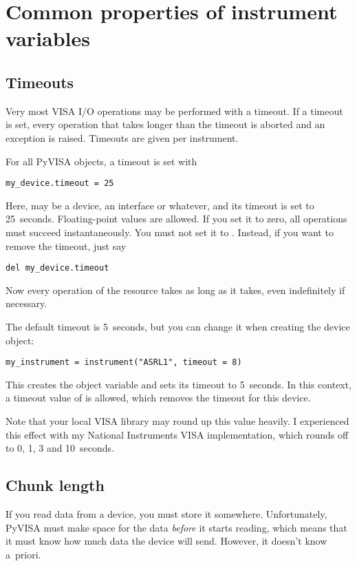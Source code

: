 \documentclass{howto}
\begin{document}
\section{Common properties of instrument variables}


\subsection{Timeouts}
\label{sec:timeouts}

Very most VISA I/O operations may be performed with a timeout.  If a timeout is
set, every operation that takes longer than the timeout is aborted and an
exception is raised.  Timeouts are given per instrument.

For all PyVISA objects, a timeout is set with
\begin{verbatim}
my_device.timeout = 25
\end{verbatim}
Here,  may be a device, an interface or whatever, and its
timeout is set to 25~seconds.  Floating-point values are allowed.  If you set
it to zero, all operations must succeed instantaneously.  You must not set it
to .  Instead, if you want to remove the timeout, just say
\begin{verbatim}
del my_device.timeout
\end{verbatim}
Now every operation of the resource takes as long as it takes, even
indefinitely if necessary.

The default timeout is 5~seconds, but you can change it when creating the
device object:
\begin{verbatim}
my_instrument = instrument("ASRL1", timeout = 8)
\end{verbatim}
This creates the object variable  and sets its timeout to
5~seconds.  In this context, a timeout value of  is allowed, which
removes the timeout for this device.

Note that your local VISA library may round up this value heavily.  I
experienced this effect with my National Instruments VISA implementation, which
rounds off to 0, 1, 3 and 10~seconds.


\subsection{Chunk length}
\label{sec:chunk-length}

If you read data from a device, you must store it somewhere.  Unfortunately,
PyVISA must make space for the data \emph{before} it starts reading, which
means that it must know how much data the device will send.  However, it
doesn't know a~priori.
\end{document}
